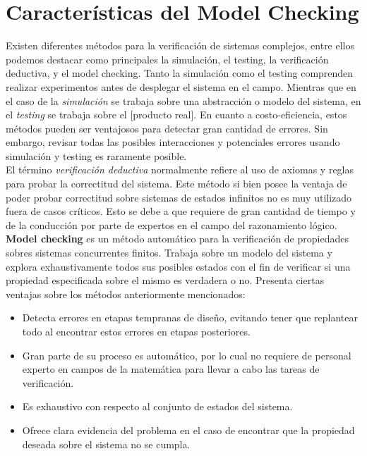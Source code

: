 \documentclass[titlepage, 12pt]{book}
\begin{document}




\section{Caracter\'isticas del Model Checking}
Existen diferentes m\'etodos para la verificaci\'on de sistemas complejos, entre ellos podemos destacar como principales la simulaci\'on, el testing, la verificaci\'on deductiva, y el model checking\cite{Clarke}. Tanto la simulaci\'on como el testing comprenden realizar experimentos antes de desplegar el sistema en el campo. Mientras que en el caso de la \textit{simulaci\'on} se trabaja sobre una abstracci\'on o modelo del sistema, en el \textit{testing} se trabaja sobre el [producto real]. En cuanto a costo-eficiencia, estos m\'etodos pueden ser ventajosos para detectar gran cantidad de errores. Sin embargo, revisar todas las posibles interacciones y potenciales errores usando simulaci\'on y testing es raramente posible.\\
El t\'ermino \textit{verificaci\'on deductiva} normalmente refiere al uso de axiomas y reglas para probar la correctitud del sistema. Este m\'etodo si bien posee la ventaja de poder probar correctitud sobre sistemas de estados infinitos no es muy utilizado fuera de casos cr\'iticos. Esto se debe a que requiere de gran cantidad de tiempo y de la conducci\'on por parte de expertos en el campo del razonamiento l\'ogico.\\

\textbf{Model checking} es un m\'etodo autom\'atico para la verificaci\'on de propiedades sobres sistemas concurrentes finitos. Trabaja sobre un modelo del sistema y explora exhaustivamente todos sus posibles estados con el fin de verificar si una propiedad especificada sobre el mismo es verdadera o no. Presenta ciertas ventajas sobre los m\'etodos anteriormente mencionados:

\begin{itemize}
\item Detecta errores en etapas tempranas de dise\~no, evitando tener que replantear todo al encontrar estos errores en etapas posteriores.

\item Gran parte de su proceso es autom\'atico, por lo cual no requiere de personal experto en campos de la matem\'atica para llevar a cabo las tareas de verificaci\'on.

\item Es exhaustivo con respecto al conjunto de estados del sistema.

\item Ofrece clara evidencia del problema en el caso de encontrar que la propiedad deseada sobre el sistema no se cumpla.
\end{itemize}
\end{document}
